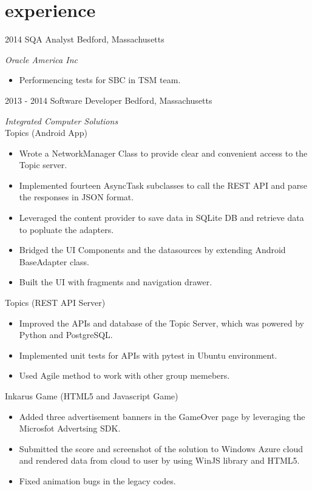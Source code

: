 \documentclass[]{ly-cv} %
\begin{document}
\section{experience}
\begin{entrylist}
\entry
{2014}
{SQA Analyst}
{Bedford, Massachusetts}
{\emph{Oracle America Inc}
\begin{itemize}
  \item Performencing tests for SBC in TSM team.
\end{itemize}}
\entry
{2013 - 2014}
{Software Developer}
{Bedford, Massachusetts}
{\emph{Integrated Computer Solutions}\vspace{1mm}\\
Topics (Android App)
\begin{itemize}
  \item Wrote a NetworkManager Class to provide clear and convenient access to the Topic server.
  \item Implemented fourteen AsyncTask subclasses to call the REST API and parse the responses in JSON format.
  \item Leveraged the content provider to save data in SQLite DB and retrieve data to popluate the adapters.
  \item Bridged the UI Components and the datasources by extending Android BaseAdapter class.
  \item Built the UI with fragments and navigation drawer.
\end{itemize}
Topics (REST API Server)
\begin{itemize}
  \item Improved the APIs and database of the Topic Server, which was powered by Python and PostgreSQL.
  \item Implemented unit tests for APIs with pytest in Ubuntu environment.
  \item Used Agile method to work with other group memebers.
\end{itemize}
Inkarus Game (HTML5 and Javascript Game)
\begin{itemize}
  \item Added three advertisement banners in the GameOver page by leveraging the Microsfot Advertsing SDK.
  \item Submitted the score and screenshot of the solution to Windows Azure cloud and rendered data from cloud to user by using WinJS library and HTML5.
  \item Fixed animation bugs in the legacy codes.
\end{itemize}}

\end{entrylist}
\end{document}
